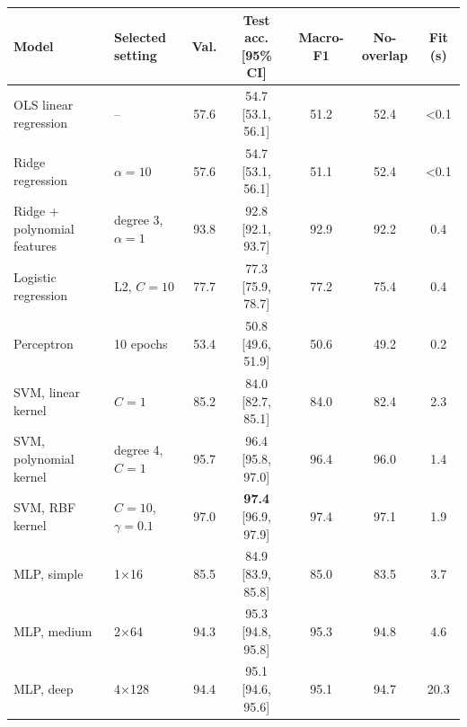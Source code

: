 \begin{tabular}{@{}llccccc@{}}
\toprule
Model & Selected setting & Val. & Test acc. [95\% CI] & Macro-F1 & No-overlap & Fit (s) \\
\midrule
OLS linear regression & -- & 57.6 & 54.7 [53.1, 56.1] & 51.2 & 52.4 & <0.1 \\
Ridge regression & $\alpha{=}10$ & 57.6 & 54.7 [53.1, 56.1] & 51.1 & 52.4 & <0.1 \\
Ridge + polynomial features & degree 3, $\alpha{=}1$ & 93.8 & 92.8 [92.1, 93.7] & 92.9 & 92.2 & 0.4 \\
\midrule
Logistic regression & L2, $C{=}10$ & 77.7 & 77.3 [75.9, 78.7] & 77.2 & 75.4 & 0.4 \\
Perceptron & 10 epochs & 53.4 & 50.8 [49.6, 51.9] & 50.6 & 49.2 & 0.2 \\
\midrule
SVM, linear kernel & $C{=}1$ & 85.2 & 84.0 [82.7, 85.1] & 84.0 & 82.4 & 2.3 \\
SVM, polynomial kernel & degree 4, $C{=}1$ & 95.7 & 96.4 [95.8, 97.0] & 96.4 & 96.0 & 1.4 \\
SVM, RBF kernel & $C{=}10$, $\gamma{=}0.1$ & 97.0 & \textbf{97.4} [96.9, 97.9] & 97.4 & 97.1 & 1.9 \\
\midrule
MLP, simple & 1$\times$16 & 85.5 & 84.9 [83.9, 85.8] & 85.0 & 83.5 & 3.7 \\
MLP, medium & 2$\times$64 & 94.3 & 95.3 [94.8, 95.8] & 95.3 & 94.8 & 4.6 \\
MLP, deep & 4$\times$128 & 94.4 & 95.1 [94.6, 95.6] & 95.1 & 94.7 & 20.3 \\
\bottomrule
\end{tabular}
